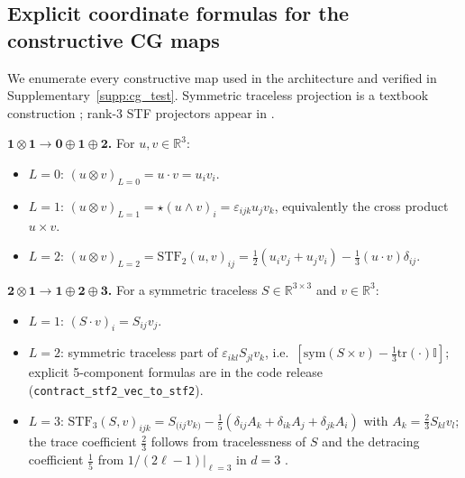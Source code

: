 \subsection{Explicit coordinate formulas for the constructive CG maps}\label{supp:cg_proof}

We enumerate every constructive map used in the architecture and verified in Supplementary~\ref{supp:cg_test}. Symmetric traceless projection is a textbook construction \citep{coope1965irreducible,applequist1989traceless,stone2013theory}; rank-3 STF projectors appear in \citet{thorne1980multipole}.

\textbf{$\mathbf{1} \otimes \mathbf{1} \to \mathbf{0} \oplus \mathbf{1} \oplus \mathbf{2}$.}
For $u, v \in \mathbb{R}^3$:
\begin{itemize}
    \item $L{=}0$: $(u \otimes v)_{L=0} = u \cdot v = u_iv_i$.
    \item $L{=}1$: $(u \otimes v)_{L=1} = \star(u \wedge v)_i = \varepsilon_{ijk}u_jv_k$, equivalently the cross product $u \times v$.
    \item $L{=}2$: $(u \otimes v)_{L=2} = \mathrm{STF}_2(u,v)_{ij} = \tfrac{1}{2}(u_iv_j + u_jv_i) - \tfrac{1}{3}(u\cdot v)\delta_{ij}$.
\end{itemize}

\textbf{$\mathbf{2} \otimes \mathbf{1} \to \mathbf{1} \oplus \mathbf{2} \oplus \mathbf{3}$.}
For a symmetric traceless $S \in \mathbb{R}^{3\times 3}$ and $v \in \mathbb{R}^3$:
\begin{itemize}
    \item $L{=}1$: $(S \cdot v)_i = S_{ij}v_j$.
    \item $L{=}2$: symmetric traceless part of $\varepsilon_{ikl}S_{jl}v_k$, i.e.\ $[\mathrm{sym}(S\times v) - \tfrac{1}{3}\mathrm{tr}(\cdot)\mathbb{I}]$; explicit 5-component formulas are in the code release (\texttt{contract\_stf2\_vec\_to\_stf2}).
    \item $L{=}3$: $\mathrm{STF}_3(S, v)_{ijk} = S_{(ij}v_{k)} - \tfrac{1}{5}(\delta_{ij}A_k + \delta_{ik}A_j + \delta_{jk}A_i)$ with $A_k = \tfrac{2}{3}S_{kl}v_l$; the trace coefficient $\tfrac{2}{3}$ follows from tracelessness of $S$ and the detracing coefficient $\tfrac{1}{5}$ from $1/(2\ell{-}1)|_{\ell=3}$ in $d{=}3$ \citep{applequist1989traceless,thorne1980multipole}.
\end{itemize}

